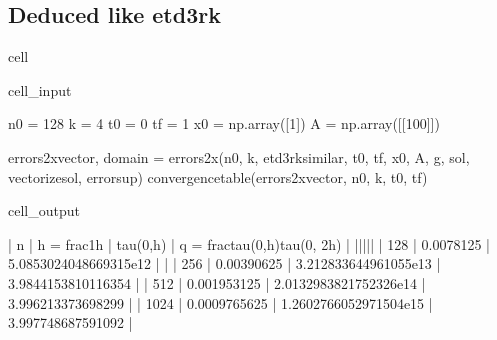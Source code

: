 \documentclass[letterpaper,10pt,english]{jupyterBook}
\begin{document}
\subsection{Deduced like etd3rk}
\label{\detokenize{appendix:deduced-like-etd3rk}}
\begin{sphinxuseclass}{cell}\begin{sphinxVerbatimInput}

\begin{sphinxuseclass}{cell_input}
\begin{sphinxVerbatim}[commandchars=\\\{\}]
n0 = 128
k = 4
t0 = 0
tf = 1
x0 = np.array([1])
A = np.array([[100]])

errors\PYGZus{}2x\PYGZus{}vector, domain = errors\PYGZus{}2x(n0, k, etd3rk\PYGZus{}similar, t0, tf, x0, A, g, sol, vectorize\PYGZus{}sol, error\PYGZus{}sup)
convergence\PYGZus{}table(errors\PYGZus{}2x\PYGZus{}vector, n0, k, t0, tf)
\end{sphinxVerbatim}

\end{sphinxuseclass}\end{sphinxVerbatimInput}
\begin{sphinxVerbatimOutput}

\begin{sphinxuseclass}{cell_output}
\begin{sphinxVerbatim}[commandchars=\\\{\}]
| n | h = \PYGZdl{}\PYGZbs{}frac\PYGZob{}1\PYGZcb{}\PYGZob{}h\PYGZcb{}\PYGZdl{} | \PYGZdl{}\PYGZbs{}tau(0,h)\PYGZdl{} | q = \PYGZdl{}\PYGZbs{}frac\PYGZob{}tau(0,h)\PYGZcb{}\PYGZob{}tau(0, 2h)\PYGZcb{}\PYGZdl{} |
|\PYGZhy{}\PYGZhy{}\PYGZhy{}|\PYGZhy{}\PYGZhy{}\PYGZhy{}\PYGZhy{}\PYGZhy{}\PYGZhy{}\PYGZhy{}\PYGZhy{}\PYGZhy{}\PYGZhy{}\PYGZhy{}\PYGZhy{}\PYGZhy{}\PYGZhy{}\PYGZhy{}\PYGZhy{}\PYGZhy{}|\PYGZhy{}\PYGZhy{}\PYGZhy{}\PYGZhy{}\PYGZhy{}\PYGZhy{}\PYGZhy{}\PYGZhy{}\PYGZhy{}\PYGZhy{}\PYGZhy{}|\PYGZhy{}\PYGZhy{}\PYGZhy{}\PYGZhy{}\PYGZhy{}\PYGZhy{}\PYGZhy{}\PYGZhy{}\PYGZhy{}\PYGZhy{}\PYGZhy{}\PYGZhy{}\PYGZhy{}\PYGZhy{}\PYGZhy{}\PYGZhy{}\PYGZhy{}\PYGZhy{}\PYGZhy{}\PYGZhy{}\PYGZhy{}\PYGZhy{}\PYGZhy{}\PYGZhy{}\PYGZhy{}\PYGZhy{}\PYGZhy{}\PYGZhy{}\PYGZhy{}\PYGZhy{}\PYGZhy{}\PYGZhy{}\PYGZhy{}|
 | 128 | 0.0078125 | 5.0853024048669315e\PYGZhy{}12 | \PYGZhy{} | 
 | 256 | 0.00390625 | 3.212833644961055e\PYGZhy{}13 | 3.9844153810116354 | 
 | 512 | 0.001953125 | 2.0132983821752326e\PYGZhy{}14 | 3.996213373698299 | 
 | 1024 | 0.0009765625 | 1.2602766052971504e\PYGZhy{}15 | 3.997748687591092 | 
\end{sphinxVerbatim}

\end{sphinxuseclass}\end{sphinxVerbatimOutput}

\end{sphinxuseclass}
\end{document}

